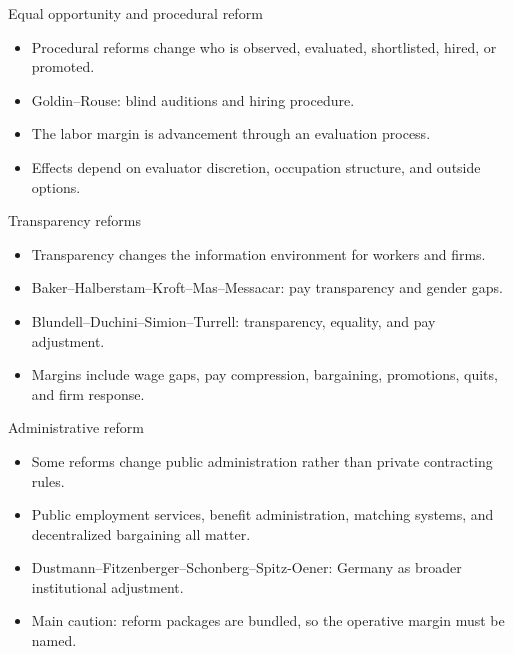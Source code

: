 \documentclass[aspectratio=169,11pt]{beamer}
\begin{document}
\begin{frame}{Equal opportunity and procedural reform}
\begin{itemize}
    \item Procedural reforms change who is observed, evaluated, shortlisted, hired, or promoted.
    \item Goldin--Rouse: blind auditions and hiring procedure.
    \item The labor margin is advancement through an evaluation process.
    \item Effects depend on evaluator discretion, occupation structure, and outside options.
\end{itemize}
\end{frame}

\begin{frame}{Transparency reforms}
\begin{itemize}
    \item Transparency changes the information environment for workers and firms.
    \item Baker--Halberstam--Kroft--Mas--Messacar: pay transparency and gender gaps.
    \item Blundell--Duchini--Simion--Turrell: transparency, equality, and pay adjustment.
    \item Margins include wage gaps, pay compression, bargaining, promotions, quits, and firm response.
\end{itemize}
\end{frame}

\begin{frame}{Administrative reform}
\begin{itemize}
    \item Some reforms change public administration rather than private contracting rules.
    \item Public employment services, benefit administration, matching systems, and decentralized bargaining all matter.
    \item Dustmann--Fitzenberger--Schonberg--Spitz-Oener: Germany as broader institutional adjustment.
    \item Main caution: reform packages are bundled, so the operative margin must be named.
\end{itemize}
\end{frame}
\end{document}
